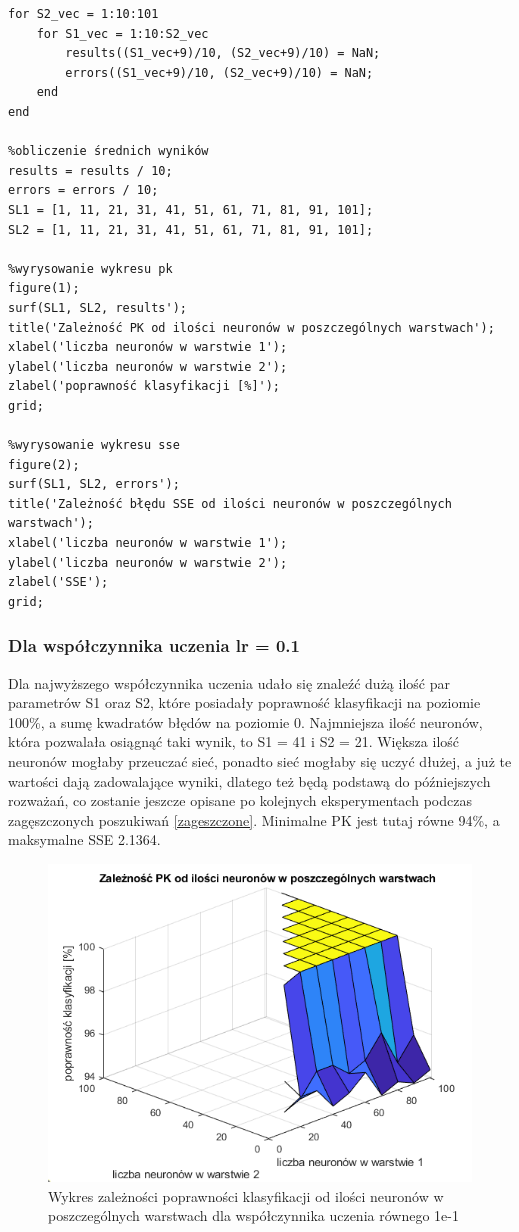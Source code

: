\documentclass[a4paper, 12pt]{article}
\begin{document}
\begin{lstlisting}[frame=single, caption=Skrypt do analizy dotyczącej wpływu ilości neuronów w obu warstwach na uczenie sieci]
%wypełnienie wartościami 'NaN' pustych miejsc w tablicy (bo S2<S1)
for S2_vec = 1:10:101
    for S1_vec = 1:10:S2_vec
        results((S1_vec+9)/10, (S2_vec+9)/10) = NaN;
        errors((S1_vec+9)/10, (S2_vec+9)/10) = NaN;
    end
end

%obliczenie średnich wyników
results = results / 10;
errors = errors / 10;
SL1 = [1, 11, 21, 31, 41, 51, 61, 71, 81, 91, 101];
SL2 = [1, 11, 21, 31, 41, 51, 61, 71, 81, 91, 101];

%wyrysowanie wykresu pk
figure(1);
surf(SL1, SL2, results');
title('Zależność PK od ilości neuronów w poszczególnych warstwach');
xlabel('liczba neuronów w warstwie 1');
ylabel('liczba neuronów w warstwie 2');
zlabel('poprawność klasyfikacji [%]');
grid;

%wyrysowanie wykresu sse
figure(2);
surf(SL1, SL2, errors');
title('Zależność błędu SSE od ilości neuronów w poszczególnych warstwach');
xlabel('liczba neuronów w warstwie 1');
ylabel('liczba neuronów w warstwie 2');
zlabel('SSE');
grid;
\end{lstlisting}

\newpage
\subsubsection{Dla współczynnika uczenia lr = 0.1}\label{lr01}
Dla najwyższego współczynnika uczenia udało się znaleźć dużą ilość par parametrów S1 oraz S2, które posiadały poprawność klasyfikacji na poziomie 100\%, a sumę kwadratów błędów na poziomie 0. Najmniejsza ilość neuronów, która pozwalała osiągnąć taki wynik, to S1 = 41 i S2 = 21. Większa ilość neuronów mogłaby przeuczać sieć, ponadto sieć mogłaby się uczyć dłużej, a już te wartości dają zadowalające wyniki, dlatego też będą podstawą do późniejszych rozważań, co zostanie jeszcze opisane po kolejnych eksperymentach podczas zagęszczonych poszukiwań \ref{zageszczone}. Minimalne PK jest tutaj równe 94\%, a maksymalne SSE 2.1364.

\begin{figure}[ht]
	\centering
	\includegraphics[width=12cm]{images/lr1 pk}
	\caption{Wykres zależności poprawności klasyfikacji od ilości neuronów w poszczególnych warstwach dla współczynnika uczenia równego 1e-1}
\label{Fig:lr1 pk}
\end{figure}
\end{document}
